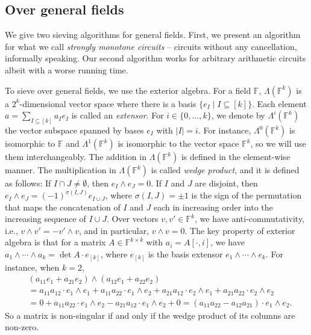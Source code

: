 \documentclass[10pt,a4paper]{article}
\newcommand{\F}{\ensuremath{\mathbb F}\xspace}
\begin{document}
\subsection{Over general fields}
\label{sec:extensor}

We give two sieving algorithms for general fields.
First, we present an algorithm for what we call \emph{strongly monotone circuits} -- circuits without any cancellation, informally speaking.
Our second algorithm works for arbitrary arithmetic circuits albeit with a worse running time.

To sieve over general fields, we use the exterior algebra.
For a field $\F$, $\Lambda(\F^k)$ is a $2^k$-dimensional vector space where there is a basis $\{ e_I \mid I \subseteq [k] \}$.
Each element $a = \sum_{I \subseteq [k]} {a_I} e_I$ is called an \emph{extensor}.
For $i \in \{ 0, \ldots, k \}$, we denote by $\Lambda^i(\F^k)$ the vector subspace spanned by bases $e_I$ with $|I| = i$.
For instance, $\Lambda^0(\F^k)$ is isomorphic to $\F$ and $\Lambda^1(\F^k)$ is isomorphic to the vector space $\F^k$, so we will use them interchangeably.
The addition in $\Lambda(\F^k)$ is defined in the element-wise manner.
The multiplication in $\Lambda(\F^k)$ is called \emph{wedge product}, and it is defined as follows:
If $I \cap J \ne \emptyset$, then $e_I \wedge e_J = 0$.
If $I$ and $J$ are disjoint, then $e_I \wedge e_J = (-1)^{\sigma(I, J)} e_{I \cup J}$, where $\sigma(I, J) = \pm 1$ is the sign of the permutation that maps the concatenation of $I$ and $J$ each in increasing order into the increasing sequence of $I \cup J$.
Over vectors $v, v' \in \F^k$, we have anti-commutativity, i.e., $v \wedge v' = -v' \wedge v$, and in particular, $v \wedge v = 0$.
The key property of exterior algebra is that for a matrix $A \in \F^{k \times k}$ with $a_i = A[\cdot, i]$, we have $a_1 \wedge \cdots \wedge a_k = \det A \cdot e_{[k]}$, where $e_{[k]}$ is the basis extensor $e_1 \wedge \cdots \wedge e_k$.
For instance, when $k = 2$,
\begin{align*}
  &(a_{11} e_1 + a_{21} e_2) \wedge (a_{12} e_1 + a_{22} e_2) \\
  &= a_{11} a_{12} \cdot e_1 \wedge e_1 + a_{11} a_{22} \cdot e_1 \wedge e_2 + a_{21} a_{12} \cdot e_2 \wedge e_1 + a_{21} a_{22} \cdot e_2 \wedge e_2 \\
  &= 0 + a_{11} a_{22} \cdot e_1 \wedge e_2 - a_{21} a_{12} \cdot e_1 \wedge e_2 + 0 = (a_{11} a_{22} - a_{12} a_{21}) \cdot e_1 \wedge e_2.
\end{align*}
So a matrix is non-singular if and only if the wedge product of its columns are non-zero.
\end{document}
